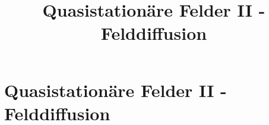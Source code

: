 

\title[TET: Quasistationäre Felder II - Felddiffusion]{Quasistationäre Felder II - Felddiffusion}


% 
% 

\maketitle

% 
% 
\section{Quasistationäre Felder II - Felddiffusion}

